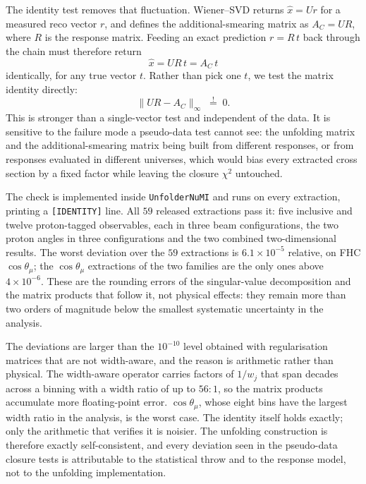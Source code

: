 \documentclass[11pt,a4paper]{article}
\begin{document}
The identity test removes that fluctuation. Wiener--SVD returns
$\hat{x} = U r$ for a measured reco vector $r$, and defines the additional-smearing matrix
as $A_C = U R$, where $R$ is the response matrix. Feeding an exact
prediction $r = R\,t$ back through the chain must therefore return
\begin{equation}
  \hat{x} = U R\, t = A_C\, t
\end{equation}
identically, for any true vector $t$. Rather than pick one $t$, we test the matrix
identity directly:
\begin{equation}
  \bigl\| U R - A_C \bigr\|_\infty \;\overset{!}{=}\; 0 .
\end{equation}
This is stronger than a single-vector test and independent of the data. It is sensitive to
the failure mode a pseudo-data test cannot see: the unfolding matrix and the additional-smearing
matrix
being built from different responses, or from responses evaluated in different universes,
which would bias every extracted cross section by a fixed factor while leaving the closure
$\chi^2$ untouched.

The check is implemented inside \texttt{UnfolderNuMI} and runs on every extraction, printing
a \texttt{[IDENTITY]} line. All $59$ released extractions pass it: five inclusive and twelve
proton-tagged observables, each in three beam configurations, the two proton angles in three
configurations and the two combined two-dimensional results. The worst deviation over the $59$
extractions is
$6.1\times10^{-5}$ relative, on FHC $\cos\theta_\mu$; the $\cos\theta_\mu$ extractions of the two
families are the only ones above $4\times10^{-6}$. These are the
rounding errors of the singular-value decomposition and the matrix products that follow it,
not physical effects: they remain more than two orders of magnitude below the smallest systematic
uncertainty in the analysis.

The deviations are larger than the $10^{-10}$ level obtained with regularisation matrices that
are not width-aware, and the reason is arithmetic rather than physical. The width-aware
operator carries factors of $1/w_j$ that span decades across a binning with a width ratio of up
to $56{:}1$, so the matrix products accumulate more floating-point error. $\cos\theta_\mu$, whose
eight bins have the largest width ratio in the analysis, is the worst case. The identity itself
holds exactly; only the arithmetic that verifies it is noisier. The unfolding construction is therefore exactly self-consistent,
and every deviation seen in the pseudo-data closure tests is attributable to the statistical
throw and to the response model, not to the unfolding implementation.
\end{document}
